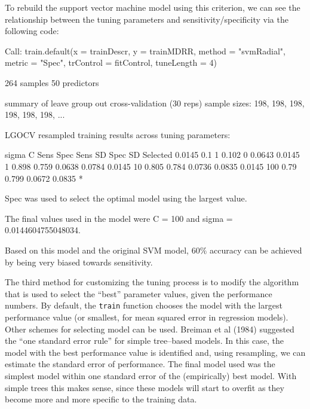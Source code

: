 \documentclass[12pt]{article}
\begin{document}
To rebuild the support vector machine model using this criterion, we can see the relationship between the tuning parameters and sensitivity/specificity via the following code:
\begin{Schunk}
\begin{Soutput}
Call:
train.default(x = trainDescr, y = trainMDRR, method = "svmRadial", 
    metric = "Spec", trControl = fitControl, tuneLength = 4)

264 samples
50 predictors

summary of leave group out cross-validation (30 reps) sample sizes:
    198, 198, 198, 198, 198, 198, ... 

LGOCV resampled training results across tuning parameters:

  sigma   C    Sens   Spec   Sens SD  Spec SD  Selected
  0.0145  0.1  1      0.102  0        0.0643           
  0.0145  1    0.898  0.759  0.0638   0.0784           
  0.0145  10   0.805  0.784  0.0736   0.0835           
  0.0145  100  0.79   0.799  0.0672   0.0835   *       

Spec was used to select the optimal model using the largest value.

The final values used in the model were C = 100 and sigma = 0.0144604755048034.
\end{Soutput}
\end{Schunk}
Based on this model and the original SVM model, 60$\%$ accuracy can be achieved  by being very biased towards sensitivity.

The third method for customizing the tuning process is to modify the algorithm that is used to select the ``best'' parameter values, given the performance numbers. By default, the \texttt{train} function chooses the model with the largest performance value (or smallest, for mean squared error in regression models). Other schemes for selecting model can be used.  Breiman et al (1984) suggested the ``one standard error rule'' for simple tree--based models. In this case, the model with the best performance value is identified and, using resampling, we can estimate the standard error of performance. The final model used was the simplest model within one standard error of the (empirically) best model. With simple trees this makes sense, since these models will start to overfit as they become more and more specific to the training data.
\end{document}
